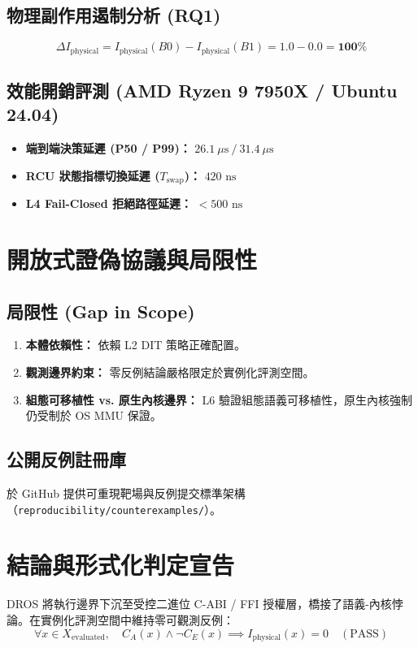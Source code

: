 \documentclass[conference]{IEEEtran}
\begin{document}
\subsection{物理副作用遏制分析 (RQ1)}
\begin{equation}
\Delta I_{\text{physical}} = I_{\text{physical}}(B0) - I_{\text{physical}}(B1) = 1.0 - 0.0 = \mathbf{100\%}
\end{equation}

\subsection{效能開銷評測 (AMD Ryzen 9 7950X / Ubuntu 24.04)}
\begin{itemize}
    \item \textbf{端到端決策延遲 (P50 / P99)：} $26.1\ \mu\text{s} \ / \ 31.4\ \mu\text{s}$
    \item \textbf{RCU 狀態指標切換延遲 ($T_{\text{swap}}$)：} $420\text{ ns}$
    \item \textbf{L4 Fail-Closed 拒絕路徑延遲：} $<500\text{ ns}$
\end{itemize}

\section{開放式證偽協議與局限性}
\subsection{局限性 (Gap in Scope)}
\begin{enumerate}
    \item \textbf{本體依賴性：} 依賴 L2 DIT 策略正確配置。
    \item \textbf{觀測邊界約束：} 零反例結論嚴格限定於實例化評測空間。
    \item \textbf{組態可移植性 vs. 原生內核邊界：} L6 驗證組態語義可移植性，原生內核強制仍受制於 OS MMU 保證。
\end{enumerate}

\subsection{公開反例註冊庫}
於 GitHub 提供可重現靶場與反例提交標準架構（\texttt{reproducibility/counterexamples/}）。

\section{結論與形式化判定宣告}
DROS 將執行邊界下沉至受控二進位 C-ABI / FFI 授權層，橋接了語義-內核悖論。在實例化評測空間中維持零可觀測反例：
\begin{equation}
\boxed{\forall x \in X_{\text{evaluated}}, \quad C_A(x) \land \neg C_E(x) \implies I_{\text{physical}}(x) = 0 \quad (\text{PASS})}
\end{equation}
\end{document}

